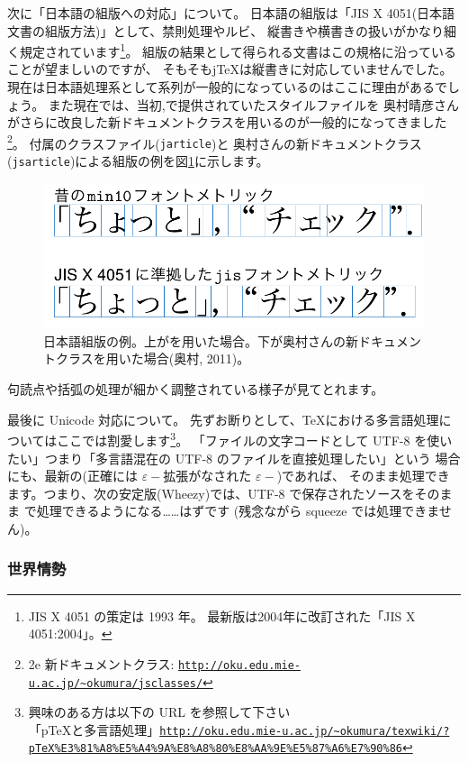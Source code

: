 \documentclass[mingoth,a4paper]{jsarticle}
\begin{document}
次に「日本語の組版への対応」について。
%
日本語の組版は「JIS X 4051(日本語文書の組版方法)」として、禁則処理やルビ、
縦書きや横書きの扱いがかなり細く規定されています\footnote{%
  JIS X 4051 の策定は 1993 年。
  最新版は2004年に改訂された「JIS X 4051:2004」。
}。
%
組版の結果として得られる文書はこの規格に沿っていることが望ましいのですが、
そもそもj{\TeX}は縦書きに対応していませんでした。
現在は日本語処理系として{\pTeX}系列が一般的になっているのはここに理由があるでしょう。
%
また現在では、当初{\pTeX,\pLaTeX}で提供されていたスタイルファイルを
奥村晴彦さんがさらに改良した新ドキュメントクラスを用いるのが一般的になってきました%
\footnote{%
  \pLaTeX2e 新ドキュメントクラス: {\tt{\url{http://oku.edu.mie-u.ac.jp/~okumura/jsclasses/}}}
}。
{\pLaTeX}付属のクラスファイル({\tt{jarticle}})と
奥村さんの新ドキュメントクラス({\tt{jsarticle}})による組版の例を図\ref{fig:jisx0451}に示します。
%
\begin{figure}[htbp!]
  \centering
  \includegraphics[width=.4\linewidth]{./image2012-gum/Okumura2011.png}
  \caption{日本語組版の例。上が{\pLaTeX}を用いた場合。下が奥村さんの新ドキュメントクラスを用いた場合(奥村, 2011)。}
  \label{fig:jisx0451}
  \vspace{-1em}
\end{figure}
句読点や括弧の処理が細かく調整されている様子が見てとれます。

最後に Unicode 対応について。
先ずお断りとして、{\TeX}における多言語処理についてはここでは割愛します\footnote{
  興味のある方は以下の URL を参照して下さい\\
  「pTeXと多言語処理」{\tt{\url{http://oku.edu.mie-u.ac.jp/~okumura/texwiki/?pTeX\%E3\%81\%A8\%E5\%A4\%9A\%E8\%A8\%80\%E8\%AA\%9E\%E5\%87\%A6\%E7\%90\%86}}}
}。
%
「ファイルの文字コードとして UTF-8 を使いたい」つまり「多言語混在の UTF-8 のファイルを直接処理したい」という
場合にも、最新の{\pLaTeX}(正確には $\varepsilon-$拡張がなされた $\varepsilon-$\pTeX)であれば、
そのまま処理できます。つまり、次の安定版(Wheezy)では、UTF-8 で保存されたソースをそのまま \pLaTeX で処理できるようになる……はずです%
(残念ながら squeeze では処理できません)。

\subsubsection{世界情勢}
\end{document}
